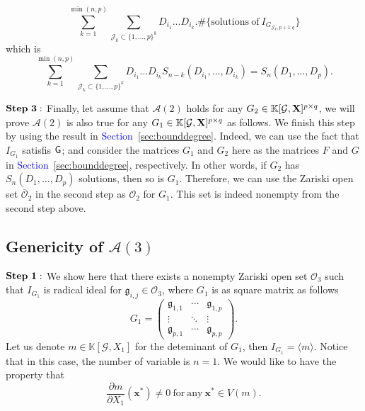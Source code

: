 \documentclass[11pt]{article}
\numberwithin{Property}{section}
\numberwithin{Theorem}{section}
\numberwithin{Proposition}{section}
\numberwithin{Lemma}{section}
\numberwithin{Corollary}{section}
\numberwithin{Definition}{section}
\numberwithin{Remark}{section}
\numberwithin{Conjecture}{section}
\numberwithin{Problem}{section}
\numberwithin{Claim}{section}
\theoremstyle{definition}
\numberwithin{Example}{section}
\def\bar{\overline}
\newcommand{\field}{\mathbb{K}} %
\newcommand{\mat}[1]{\mathbf{\MakeUppercase{#1}}} %
\newcommand{\improve}[1]{\textcolor{blue}{#1}} %
\begin{document}
\[\sum_{k=1}^{\min(n,p)} \sum_{\mathcal{J}_k \subset\{1, \ldots, p\}^k}D_{i_1} \ldots D_{i_k} . \# \{\mathrm{solutions \ of \ } I_{G_{\mathcal{J}_k, p+1:q}}\}\] which is 
\[
\sum_{k=1}^{\min(n,p)} \sum_{\mathcal{J}_k \subset\{1, \ldots, p\}^k}D_{i_1} \ldots D_{i_k}S_{n-k}(D_{i_1}, \ldots, D_{i_k}) = S_n(D_1, \ldots, D_p). 
\]

$\bf{Step \ 3:}$ Finally, let assume that $\mathcal{A}(2)$ holds for any $G_2 \in \field[\mathcal{G}, \mat{X}]^{p \times q}$, we will prove $\mathcal{A}(2)$ is also true for any $G_1 \in \field[\mathcal{G}, \mat{X}]^{p \times q}$ as follows. We finish this step by using the result in \improve{Section~\ref{sec:bounddegree}}. Indeed, we can use the fact that $I_{G_1}$ satisfis ${\sf G}$; and consider the matrices $G_1$ and $G_2$ here as the matrices $F$ and $G$ in \improve{Section~\ref{sec:bounddegree}}, respectively. In other words, if $G_2$ has $S_n(D_1, \ldots, D_p)$ solutions, then so is $G_1$. Therefore, we can use the Zariski open set $\bar{\mathcal{O}}_2$ in the second step as ${\mathcal{O}_2}$ for $G_1$. This set is indeed nonempty from the second step above. 
\subsection{Genericity of $\mathcal{A}(3)$} 
$\bf{Step \ 1:}$ We show here that there exists a nonempty Zariski open set $\mathcal{O}_3$ such that $I_{G_1}$ is radical ideal for $\mathfrak{g}_{i,j} \in \mathcal{O}_3$, where $G_1$ is as square matrix as follows 
\[
G_1 = \left( \begin{matrix}
\mathfrak{g}_{1,1}  & \cdots  & \mathfrak{g}_{1, p}\\
\vdots & \ddots & \vdots \\
\mathfrak{g}_{p,1} & \cdots  & \mathfrak{g}_{p, p}
\end{matrix} \right).
\] Let us denote $m \in \field[\mathcal{G}, X_1]$ for the deteminant of $G_1$, then $I_{G_1} = \langle m \rangle$. Notice that in this case, the number of variable is $n = 1$. We would like to have the property that \[\frac{\partial m}{\partial X_1}(\mathbf{x}^*) \ne 0 \ \mathrm{for \ any} \ \mathbf{x}^* \in V(m). \] 
\end{document}
